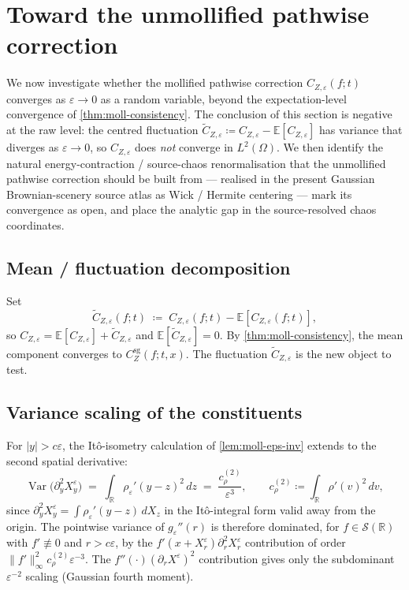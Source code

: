 \documentclass[11pt,reqno]{amsart}
\theoremstyle{plain}
\theoremstyle{definition}
\theoremstyle{remark}
\newcommand{\R}{\mathbb{R}}
\newcommand{\E}{\mathbb{E}}
\newcommand{\IBM}{Z}
\DeclareMathOperator{\Var}{Var}
\begin{document}
\section{Toward the unmollified pathwise correction}\label{sec:toward-unmoll}

We now investigate whether the mollified pathwise correction
$C_{\IBM,\varepsilon}(f;t)$ converges as $\varepsilon\to 0$ as a
random variable, beyond the expectation-level convergence of
\cref{thm:moll-consistency}. The conclusion of this section is
negative at the raw level: the centred fluctuation
$\tilde C_{\IBM,\varepsilon}\coloneqq C_{\IBM,\varepsilon}-\E[C_{\IBM,\varepsilon}]$
has variance that diverges as $\varepsilon\to 0$, so
$C_{\IBM,\varepsilon}$ does \emph{not} converge in $L^{2}(\Omega)$.
We then identify the natural energy-contraction / source-chaos
renormalisation that the unmollified pathwise correction should be
built from --- realised in the present Gaussian Brownian-scenery
source atlas as Wick / Hermite centering --- mark its convergence as
open, and place the analytic gap in the source-resolved chaos
coordinates.

\subsection*{Mean / fluctuation decomposition}

Set
\begin{equation}\label{eq:decomp}
  \tilde C_{\IBM,\varepsilon}(f;t)
   \;\coloneqq\;C_{\IBM,\varepsilon}(f;t)-\E[C_{\IBM,\varepsilon}(f;t)],
\end{equation}
so $C_{\IBM,\varepsilon}=\E[C_{\IBM,\varepsilon}]+\tilde C_{\IBM,\varepsilon}$
and $\E[\tilde C_{\IBM,\varepsilon}]=0$. By \cref{thm:moll-consistency},
the mean component converges to $C_\IBM^{\mathrm{sg}}(f;t,x)$. The
fluctuation $\tilde C_{\IBM,\varepsilon}$ is the new object to test.

\subsection*{Variance scaling of the constituents}

For $|y|>c\varepsilon$, the It\^o-isometry calculation of
\cref{lem:moll-eps-inv} extends to the second spatial derivative:
\begin{equation}\label{eq:var-2deriv}
  \Var\bigl(\partial_y^{2}X^\varepsilon_y\bigr)
  \;=\;\int_\R\rho_\varepsilon'(y-z)^{2}\,dz
  \;=\;\frac{c_\rho^{(2)}}{\varepsilon^{3}},
  \qquad c_\rho^{(2)}\coloneqq\int_\R\rho'(v)^{2}\,dv,
\end{equation}
since $\partial_y^{2}X^\varepsilon_y=\int\rho_\varepsilon'(y-z)\,dX_z$ in
the It\^o-integral form valid away from the origin. The pointwise
variance of $g_\varepsilon''(r)$ is therefore dominated, for
$f\in\mathscr S(\R)$ with $f'\not\equiv 0$ and $r>c\varepsilon$, by
the $f'(x+X^\varepsilon_r)\partial_r^{2}X^\varepsilon_r$ contribution
of order $\|f'\|_\infty^{2}c_\rho^{(2)}\varepsilon^{-3}$. The
$f''(\cdot)(\partial_rX^\varepsilon)^{2}$ contribution gives only the
subdominant $\varepsilon^{-2}$ scaling (Gaussian fourth moment).
\end{document}
